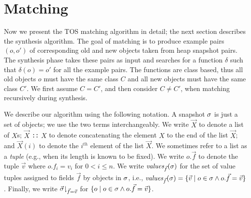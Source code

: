 \documentclass[natbib,10pt]{sigplanconf}
\newcommand{\code}[1]{\lstinline|#1|\xspace}
\newcommand{\TOS}{TOS\xspace}
\begin{document}





\section{Matching}
\label{sec:matching}

Now we present the \TOS matching algorithm in detail; the next section
describes the synthesis algorithm.  The goal of matching is to produce
example pairs $(o,o')$ of corresponding old and new objects taken from 
heap snapshot pairs.  The synthesis phase takes these pairs as input and
searches for a function $\delta$ such that $\delta(o) = o'$ for all
the example pairs.  The functions are  class based, thus all old
objects $o$ must have the same class $C$ and all new objects must
have the same class $C'$. We first assume $C = C'$, and then
consider $C \neq C'$, when matching recursively during
synthesis.

We describe our algorithm using the following notation.  A snapshot
$\sigma$ is just a set of objects; we use the two terms interchangeably.
We write $\vec{X}$ to denote a list of $X$s; $\vec{X}$
\code{::} $X$ to denote concatenating the element $X$ to the end of
the list $\vec{X}$; and $\vec{X}(i)$ to denote the $i^{th}$ element of
the list $\vec{X}$.  We sometimes refer to a list as a \emph{tuple} (e.g.,
when its length is known to be fixed).
We write $o.\vec{f}$ to denote the tuple $\vec{v}$
where $o.f_i = v_i$ for $0 < i \leq n$.  We write
$\textit{values}_{\vec{f}}(\sigma)$ for the set of value tuples assigned to
fields $\vec{f}$ by objects in $\sigma$, i.e., $\textit{values}_{\vec{f}}(\sigma) =
\{\vec{v} \mid o \in \sigma \wedge o.\vec{f} = \vec{v} \}$. Finally, we
write $\vec{\sigma} \mathord\downharpoonright_{\vec{f} = \vec{v}}$ for $\{o \mid o \in
\sigma \wedge o.\vec{f} = \vec{v}\}$.
\end{document}
